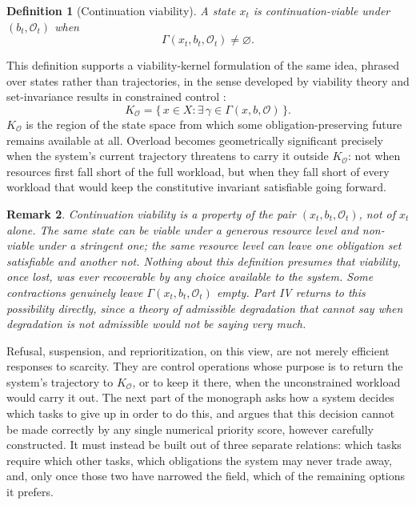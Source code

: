 \documentclass[11pt]{report}
\newtheorem{definition}{Definition}[chapter]
\newtheorem{remark}[definition]{Remark}
\begin{document}
\begin{definition}[Continuation viability]
A state $x_t$ is continuation-viable under $(b_t, \mathcal O_t)$ when
\[
\Gamma(x_t, b_t, \mathcal O_t) \ne \varnothing.
\]
\end{definition}

This definition supports a viability-kernel formulation of the same idea, phrased over states rather than trajectories, in the sense developed by viability theory and set-invariance results in constrained control \cite{aubin1991,nagumo1942,blanchini1999}:
\[
K_{\mathcal O} = \bigl\{\, x \in X : \exists\, \gamma \in \Gamma(x, b, \mathcal O) \,\bigr\}.
\]
$K_{\mathcal O}$ is the region of the state space from which some obligation-preserving future remains available at all. Overload becomes geometrically significant precisely when the system's current trajectory threatens to carry it outside $K_{\mathcal O}$: not when resources first fall short of the full workload, but when they fall short of every workload that would keep the constitutive invariant satisfiable going forward.

\begin{remark}
Continuation viability is a property of the pair $(x_t, b_t, \mathcal O_t)$, not of $x_t$ alone. The same state can be viable under a generous resource level and non-viable under a stringent one; the same resource level can leave one obligation set satisfiable and another not. Nothing about this definition presumes that viability, once lost, was ever recoverable by any choice available to the system. Some contractions genuinely leave $\Gamma(x_t, b_t, \mathcal O_t)$ empty. Part IV returns to this possibility directly, since a theory of admissible degradation that cannot say when degradation is not admissible would not be saying very much.
\end{remark}

Refusal, suspension, and reprioritization, on this view, are not merely efficient responses to scarcity. They are control operations whose purpose is to return the system's trajectory to $K_{\mathcal O}$, or to keep it there, when the unconstrained workload would carry it out. The next part of the monograph asks how a system decides which tasks to give up in order to do this, and argues that this decision cannot be made correctly by any single numerical priority score, however carefully constructed. It must instead be built out of three separate relations: which tasks require which other tasks, which obligations the system may never trade away, and, only once those two have narrowed the field, which of the remaining options it prefers.
\end{document}
